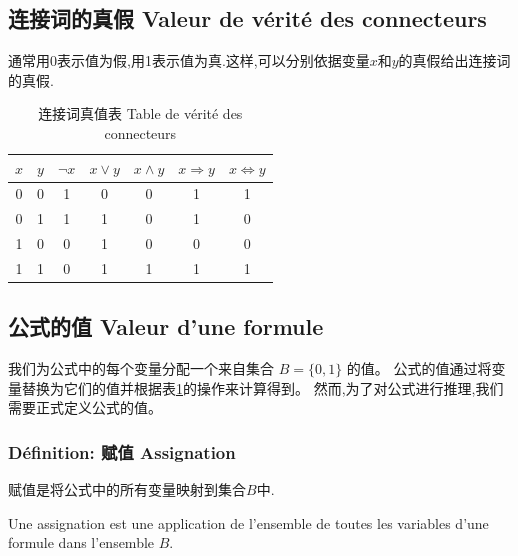 \documentclass[12pt, a4paper, oneside]{ctexbook}
\begin{document}
  \subsection{连接词的真假 Valeur de vérité des connecteurs}
  通常用0表示值为假,用1表示值为真.这样,可以分别依据变量$x$和$y$的真假给出连接词的真假.
  \begin{table}[H]
    \centering
  \begin{tabular}{|c|c|c|c|c|c|c|}
    \hline
    $x$ & $y$ & $\neg x$ & $x \lor y$ & $x \land y$ & $x \Rightarrow y$ & $x \Leftrightarrow y$ \\\hline
    0 & 0 & 1 & 0 & 0 & 1 & 1 \\\hline
    0 & 1 & 1 & 1 & 0 & 1 & 0 \\\hline
    1 & 0 & 0 & 1 & 0 & 0 & 0 \\\hline
    1 & 1 & 0 & 1 & 1 & 1 & 1 \\\hline
    \end{tabular}
    \caption{连接词真值表 Table de vérité des connecteurs}
    \label{tab:connecteurs}
  \end{table}
  \subsection{公式的值 Valeur d'une formule}
  我们为公式中的每个变量分配一个来自集合 $B = \{0, 1\}$ 的值。
  公式的值通过将变量替换为它们的值并根据表\ref{tab:connecteurs}的操作来计算得到。
  然而,为了对公式进行推理,我们需要正式定义公式的值。
  \subsubsection{Définition: 赋值 Assignation}
  赋值是将公式中的所有变量映射到集合$B$中.

  Une assignation est une application de l'ensemble de toutes les variables d'une formule dans l'ensemble $B$.
\end{document}
